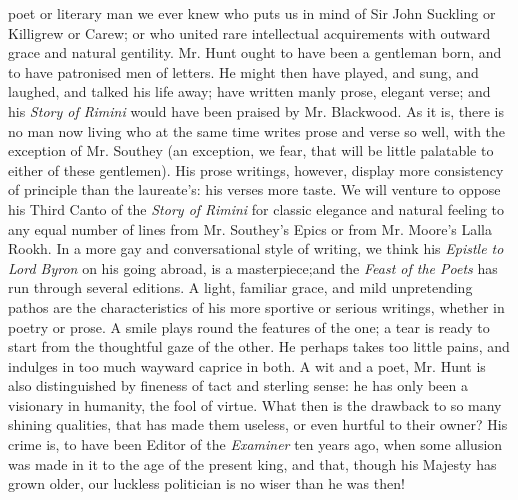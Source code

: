 poet or literary man we ever knew who puts us in mind of Sir John
Suckling or Killigrew or Carew; or who united rare intellectual
acquirements with outward grace and natural gentility.  Mr. Hunt
ought to have been a gentleman born, and to have patronised men of
letters. He might then have played, and sung, and laughed, and
talked his life away; have written manly prose, elegant verse; and
his \emph{Story of Rimini} would have been praised by
Mr. Blackwood. As it is, there is no man now living who at the
same time writes prose and verse so well, with the exception of
Mr. Southey (an exception, we fear, that will be little palatable
to either of these gentlemen). His prose writings, however,
display more consistency of principle than the laureate's: his
verses more taste. We will venture to oppose his Third Canto of
the \emph{Story of Rimini} for classic elegance and natural
feeling to any equal number of lines from Mr. Southey's Epics or
from Mr. Moore's Lalla Rookh. In a more gay and conversational
style of writing, we think his \emph{Epistle to Lord Byron} on his
going abroad, is a masterpiece;\textemdash and the \emph{Feast of
  the Poets} has run through several editions. A light, familiar
grace, and mild unpretending pathos are the characteristics of his
more sportive or serious writings, whether in poetry or prose. A
smile plays round the features of the one; a tear is ready to
start from the thoughtful gaze of the other. He perhaps takes too
little pains, and indulges in too much wayward caprice in both. A
wit and a poet, Mr. Hunt is also distinguished by fineness of tact
and sterling sense: he has only been a visionary in humanity, the
fool of virtue. What then is the drawback to so many shining
qualities, that has made them useless, or even hurtful to their
owner? His crime is, to have been Editor of the \emph{Examiner}
ten years ago, when some allusion was made in it to the age of the
present king, and that, though his Majesty has grown older, our
luckless politician is no wiser than he was then!
